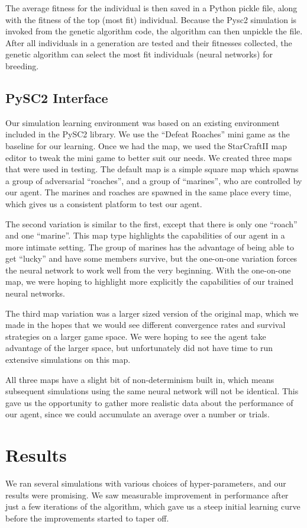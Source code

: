 \documentclass{article}
\begin{document}
The average fitness for the individual is then saved in a Python pickle file,
along with the fitness of the top (most fit) individual.  Because the Pysc2
simulation is invoked from the genetic algorithm code, the algorithm can then
unpickle the file.  After all individuals in a generation are tested and their
fitnesses collected, the genetic algorithm can select the most fit individuals
(neural networks) for breeding.

\subsection{PySC2 Interface}
Our simulation learning environment was based on an existing environment
included in the PySC2 library\cite{pysc2}. We use the ``Defeat Roaches'' mini
game as the baseline for our learning. Once we had the map, we used the
StarCraftII map editor to tweak the mini game to better suit our needs. We
created three maps that were used in testing. The default map is a simple square
map which spawns a group of adversarial ``roaches'', and a group of ``marines'',
who are controlled by our agent. The marines and roaches are spawned in the same
place every time, which gives us a consistent platform to test our agent.

The second variation is similar to the first, except that there is only one
``roach'' and one ``marine''. This map type highlights the capabilities of our
agent in a more intimate setting. The group of marines has the advantage of
being able to get ``lucky'' and have some members survive, but the one-on-one
variation forces the neural network to work well from the very beginning.  With
the one-on-one map, we were hoping to highlight more explicitly the capabilities
of our trained neural networks.

The third map variation was a larger sized version of the original map, which we
made in the hopes that we would see different convergence rates and survival
strategies on a larger game space. We were hoping to see the agent take
advantage of the larger space, but unfortunately did not have time to run
extensive simulations on this map.

All three maps have a slight bit of non-determinism built in, which means
subsequent simulations using the same neural network will not be identical. This
gave us the opportunity to gather more realistic data about the performance of
our agent, since we could accumulate an average over a number or trials.

\section{Results} We ran several simulations with various choices of
hyper-parameters, and our results were promising. We saw measurable improvement
in performance after just a few iterations of the algorithm, which gave us a
steep initial learning curve before the improvements started to taper off.
\end{document}
